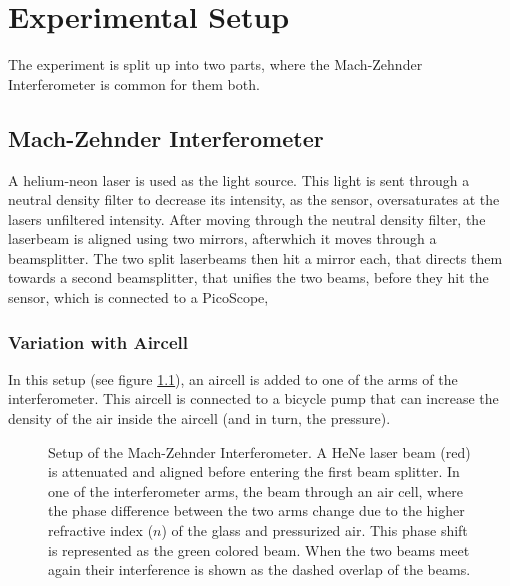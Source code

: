 \chapter{Experimental Setup}
The experiment is split up into two parts, where the Mach-Zehnder Interferometer is common for them both.
\section{Mach-Zehnder Interferometer}
A helium-neon laser\autocite{thorlabs_henelaser_manual} is used as the light source.
This light is sent through a neutral density filter to decrease its intensity, 
as the sensor\autocite{thorlabs_detector_manual}, oversaturates at the lasers unfiltered intensity.
After moving through the neutral density filter, 
the laserbeam is aligned using two mirrors,
afterwhich it moves through a beamsplitter.
The two split laserbeams then hit a mirror each,
that directs them towards a second beamsplitter,
that unifies the two beams, before they hit the sensor, which is connected to a PicoScope\autocite{PicoScope3203D},
\subsection{Variation with Aircell}
In this setup (see figure \ref{fig:setup_with_aircell}),
an aircell is added to one of the arms of the interferometer. 
This aircell is connected to a bicycle pump that can increase the density of the air inside the aircell (and in turn, the pressure).
\begin{figure}
    \centering
    
    \caption{Setup of the Mach-Zehnder Interferometer. 
    A HeNe laser beam (red) is attenuated and aligned before entering the first beam splitter. 
    In one of the interferometer arms, the beam through an air cell, where the phase difference between the two arms change due to the higher refractive index ($n$) of the glass and pressurized air.  
    This phase shift is represented as the green colored beam. 
    When the two beams meet again their interference is shown as the dashed overlap of the beams.}
    \label{fig:setup_with_aircell}
\end{figure}
